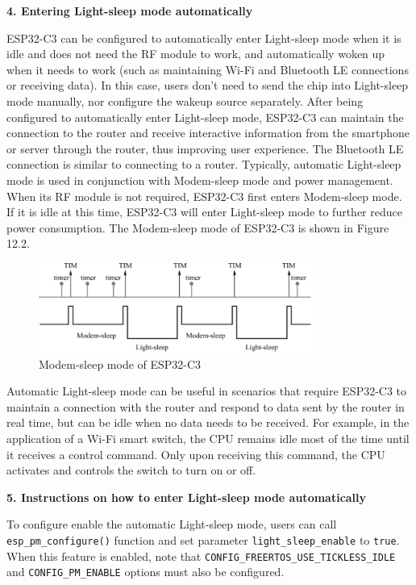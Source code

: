 \documentclass[a4paper,12pt,openany]{book}
\begin{document}
\textbf{4. Entering Light-sleep mode automatically}

ESP32-C3 can be configured to automatically enter Light-sleep mode when it is idle and does not need the RF module to work, and automatically woken up when it needs to work (such as maintaining Wi-Fi and Bluetooth LE connections or receiving data). In this case, users don’t need to send the chip into Light-sleep mode manually, nor configure the wakeup source separately. After being configured to automatically enter Light-sleep mode, ESP32-C3 can maintain the connection to the router and receive interactive information from the smartphone or server through the router, thus improving user experience. The Bluetooth LE connection is similar to connecting to a router. Typically, automatic Light-sleep mode is used in conjunction with Modem-sleep mode and power management. When its RF module is not required, ESP32-C3 first enters Modem-sleep mode. If it is idle at this time, ESP32-C3 will enter Light-sleep mode to further reduce power consumption. The Modem-sleep mode of ESP32-C3 is shown in Figure 12.2.

\begin{figure}[!h]
    \centering
    \includegraphics[width=0.8\textwidth]{D12Z/12-2}
    \caption{Modem-sleep mode of ESP32-C3}
\end{figure}

Automatic Light-sleep mode can be useful in scenarios that require ESP32-C3 to maintain a connection with the router and respond to data sent by the router in real time, but can be idle when no data needs to be received. For example, in the application of a Wi-Fi smart switch, the CPU remains idle most of the time until it receives a control command. Only upon receiving this command, the CPU activates and controls the switch to turn on or off.

\textbf{5. Instructions on how to enter Light-sleep mode automatically}

To configure enable the automatic Light-sleep mode, users can call \verb|esp_pm_configure()| function and set parameter \verb|light_sleep_enable| to \verb|true|. When this feature is enabled, note that \verb|CONFIG_FREERTOS_USE_TICKLESS_IDLE| and \verb|CONFIG_PM_ENABLE| options must also be configured.
\end{document}
